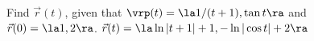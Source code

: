 {Find $\vec r(t)$, given that $\vrp(t) = \la 1/(t+1),\tan t\ra$ and \\ $\vec r(0) = \la 1,2\ra$.
}
{
$\vec r(t) = \la \ln |t+1| + 1, -\ln |\cos t| + 2\ra$
}

